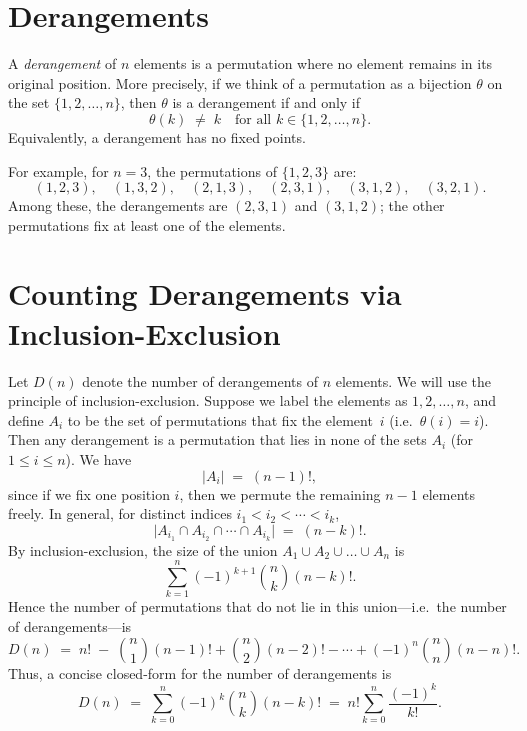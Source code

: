 \documentclass[docmute]{article}
\begin{document}
\section{Derangements}

A \emph{derangement} of $n$ elements is a permutation where no element remains in its original position. More precisely, if we think of a permutation as a bijection $\theta$ on the set $\{1,2,\ldots,n\}$, then $\theta$ is a derangement if and only if 
\[
\theta(k) \;\neq\; k \quad \text{for all } k \in \{1,2,\dots,n\}.
\]
Equivalently, a derangement has no fixed points.

For example, for $n=3$, the permutations of $\{1,2,3\}$ are:
\[
(1,2,3), \quad (1,3,2), \quad (2,1,3), \quad (2,3,1), \quad (3,1,2), \quad (3,2,1).
\]
Among these, the derangements are $(2,3,1)$ and $(3,1,2)$; the other permutations fix at least one of the elements.

\section{Counting Derangements via Inclusion-Exclusion}

Let $D(n)$ denote the number of derangements of $n$ elements. We will use the principle of inclusion-exclusion. Suppose we label the elements as $1,2,\dots,n$, and define $A_i$ to be the set of permutations that fix the element~$i$ (i.e.\ $\theta(i)=i$). Then any derangement is a permutation that lies in none of the sets $A_i$ (for $1 \le i \le n$). We have
\[
\bigl|A_i\bigr| \;=\; (n-1)!,
\]
since if we fix one position $i$, then we permute the remaining $n-1$ elements freely. In general, for distinct indices $i_1 < i_2 < \cdots < i_k$,
\[
\bigl|A_{i_1} \cap A_{i_2} \cap \cdots \cap A_{i_k}\bigr| \;=\; (n-k)!.
\]
By inclusion-exclusion, the size of the union $A_1 \cup A_2 \cup \dots \cup A_n$ is
\[
\sum_{k=1}^{n} (-1)^{k+1} \binom{n}{k} (n-k)!.
\]
Hence the number of permutations that do not lie in this union---i.e.\ the number of derangements---is
\[
D(n) \;=\; n! \;-\; \binom{n}{1}(n-1)! + \binom{n}{2}(n-2)! - \cdots + (-1)^n \binom{n}{n}(n-n)!.
\]
Thus, a concise closed-form for the number of derangements is
\[
D(n) \;=\; \sum_{k=0}^{n} (-1)^k \binom{n}{k} (n-k)!
\;=\; n! \sum_{k=0}^{n} \frac{(-1)^k}{k!}.
\]

\begin{center}
\end{center}
\end{document}

